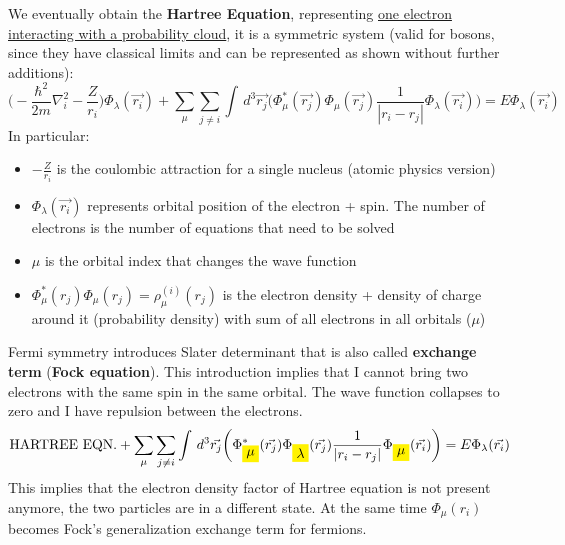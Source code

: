 We eventually obtain the \textbf{Hartree Equation}, representing \ul{one electron interacting with a probability cloud}, it is a symmetric system (valid for bosons, since they have classical limits and can be represented as shown without further additions):
\[
\bigg(-\frac{\hbar^2}{2m}\nabla^2_i-\frac{Z}{r_i}\bigg)\Phi_\lambda(\vec{r_i})+\sum_\mu \sum_{j \neq i} \int\,d^3\vec{r_j}\bigg(\Phi^*_\mu(\vec{r_j})\Phi_\mu(\vec{r_j})\frac{1}{|r_i-r_j|}\Phi_\lambda(\vec{r_i})\bigg)=E\Phi_\lambda(\vec{r_i})
\]
In particular:
\begin{itemize}
	\item $-\frac{Z}{r_i}$ is the coulombic attraction for a single nucleus (atomic physics version)
	\item $\Phi_\lambda(\vec{r_i})$ represents orbital position of the electron + spin. The number of electrons is the number of equations that need to be solved
	\item $\mu$ is the orbital index that changes the wave function
	\item $\Phi^*_\mu(r_j)\Phi_\mu(r_j) = \rho_\mu^{(i)}(r_j)$ is the electron density + density of charge around it (probability density) with sum of all electrons in all orbitals ($\mu$)
\end{itemize}
Fermi symmetry introduces Slater determinant that is also called \textbf{exchange term} (\textbf{Fock equation}). This introduction implies that I cannot bring two electrons with the same spin in the same orbital. The wave function collapses to zero and I have repulsion between the electrons.\\
\[
\text{HARTREE EQN.}+
\sum_\mu \sum_{j \neq i} \int\,d^3\vec{r_j}\bigg(\Phi^*_{\mathcolorbox{yellow}{\mu}}(\vec{r_j})\Phi_{\mathcolorbox{yellow}{\lambda}}(\vec{r_j})\frac{1}{|r_i-r_j|}\Phi_{\mathcolorbox{yellow}{\mu}}(\vec{r_i})\bigg)=E\Phi_\lambda(\vec{r_i})
\]
This implies that the electron density factor of Hartree equation is not present anymore, the two particles are in a different state. At the same time $\Phi_\mu(r_i)$ becomes Fock's generalization exchange term for fermions.\\

